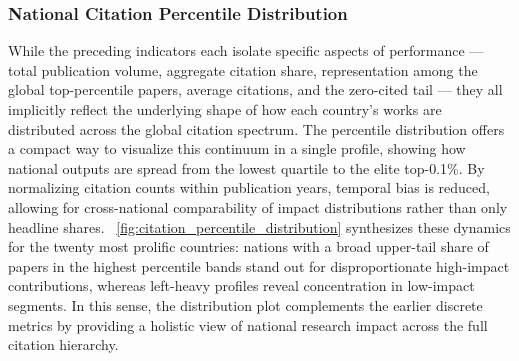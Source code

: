 \documentclass{article}
\begin{document}
\subsubsection{National Citation Percentile Distribution} 
While the preceding indicators each isolate specific aspects of performance — total publication volume, aggregate citation share, representation among the global top-percentile papers, average citations, and the zero-cited tail — they all implicitly reflect the underlying shape of how each country’s works are distributed across the global citation spectrum. The percentile distribution offers a compact way to visualize this continuum in a single profile, showing how national outputs are spread from the lowest quartile to the elite top-0.1\%. By normalizing citation counts within publication years, temporal bias is reduced, allowing for cross-national comparability of impact distributions rather than only headline shares. \figurename~\ref{fig:citation_percentile_distribution} synthesizes these dynamics for the twenty most prolific countries: nations with a broad upper-tail share of papers in the highest percentile bands stand out for disproportionate high-impact contributions, whereas left-heavy profiles reveal concentration in low-impact segments. In this sense, the distribution plot complements the earlier discrete metrics by providing a holistic view of national research impact across the full citation hierarchy.
\end{document}

